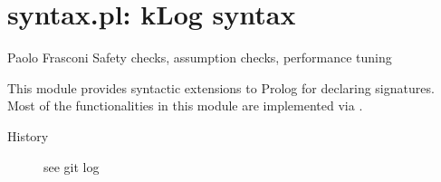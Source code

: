 


\section{syntax.pl: kLog syntax}

\label{sec:syntax}

\begin{tags}
Paolo Frasconi
Safety checks, assumption checks, performance tuning
\end{tags}

This module provides syntactic extensions to Prolog for declaring
signatures. Most of the functionalities in this module are
implemented via .

\begin{description}
    \item[History] 
see git log
\end{description}

\vspace{0.7cm}

